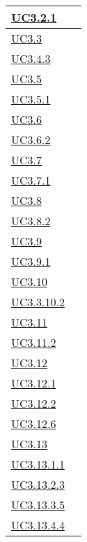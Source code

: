 \begin{longtable}{|P{6cm}|P{6cm}|}
	\hline \hyperref[UC3.2.1]{UC3.2.1} &  \\
	\hline \hyperref[UC3.3]{UC3.3} &  \\
	\hline \hyperref[UC3.4.3]{UC3.4.3} &  \\
	\hline \hyperref[UC3.5]{UC3.5} &  \\
	\hline \hyperref[UC3.5.1]{UC3.5.1} &  \\
	\hline \hyperref[UC3.6]{UC3.6} &  \\
	\hline \hyperref[UC3.6.2]{UC3.6.2} &  \\
	\hline \hyperref[UC3.7]{UC3.7} &  \\
	\hline \hyperref[UC3.7.1]{UC3.7.1} &  \\
	\hline \hyperref[UC3.8]{UC3.8} &  \\
	\hline \hyperref[UC3.8.2]{UC3.8.2} &  \\
	\hline \hyperref[UC3.9]{UC3.9} &  \\
	\hline \hyperref[UC3.9.1]{UC3.9.1} &  \\
	\hline \hyperref[UC3.10]{UC3.10} &  \\
	\hline \hyperref[UC3.10.2]{UC3.3.10.2} &  \\
	\hline \hyperref[UC3.11]{UC3.11} &  \\
	\hline \hyperref[UC3.11.2]{UC3.11.2} &  \\
	\hline \hyperref[UC3.12]{UC3.12} &  \\
	\hline \hyperref[UC3.12.1]{UC3.12.1} &  \\
	\hline \hyperref[UC3.12.2]{UC3.12.2} &  \\
	\hline \hyperref[UC3.12.6]{UC3.12.6} &  \\
	\hline \hyperref[UC3.13]{UC3.13} &  \\
	\hline \hyperref[UC3.13.1.1]{UC3.13.1.1} &  \\
	\hline \hyperref[UC3.13.2.3]{UC3.13.2.3} &  \\
	\hline \hyperref[UC3.13.3.5]{UC3.13.3.5} &  \\
	\hline \hyperref[UC3.13.4.4]{UC3.13.4.4} &  \\

\end{longtable}
